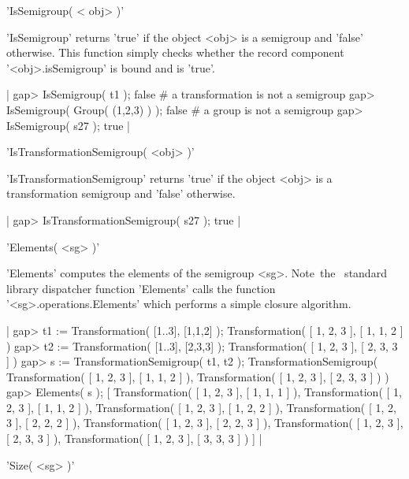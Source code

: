 
'IsSemigroup( < obj> )' 

'IsSemigroup' returns 'true' if the object <obj> is a semigroup
and 'false' otherwise. This function simply checks whether the record 
component '<obj>.isSemigroup' is bound and is 'true'.

|  gap> IsSemigroup( t1 );      
  false                         # a transformation is not a semigroup  
  gap> IsSemigroup( Group( (1,2,3) ) );
  false                         # a group is not a semigroup
  gap> IsSemigroup( s27 );
  true
|


'IsTransformationSemigroup( <obj> )' 

'IsTransformationSemigroup' returns 'true' if the object <obj> 
is a transformation semigroup and 'false' otherwise. 

|  gap> IsTransformationSemigroup( s27 );
  true
|



'Elements( <sg> )' 

'Elements' computes the elements of the semigroup <sg>. Note\:\ the 
\GAP\ standard library dispatcher function 'Elements' calls the function 
'<sg>.operations.Elements' which performs a simple closure 
algorithm.

|  gap> t1 := Transformation( [1..3], [1,1,2] );
  Transformation( [ 1, 2, 3 ], [ 1, 1, 2 ] )
  gap> t2 := Transformation( [1..3], [2,3,3] );
  Transformation( [ 1, 2, 3 ], [ 2, 3, 3 ] )
  gap> s := TransformationSemigroup( t1, t2 );
  TransformationSemigroup( Transformation( [ 1, 2, 3 ], 
  [ 1, 1, 2 ] ), Transformation( [ 1, 2, 3 ], [ 2, 3, 3 ] ) ) 
  gap> Elements( s );
  [ Transformation( [ 1, 2, 3 ], [ 1, 1, 1 ] ), 
    Transformation( [ 1, 2, 3 ], [ 1, 1, 2 ] ), 
    Transformation( [ 1, 2, 3 ], [ 1, 2, 2 ] ), 
    Transformation( [ 1, 2, 3 ], [ 2, 2, 2 ] ), 
    Transformation( [ 1, 2, 3 ], [ 2, 2, 3 ] ), 
    Transformation( [ 1, 2, 3 ], [ 2, 3, 3 ] ), 
    Transformation( [ 1, 2, 3 ], [ 3, 3, 3 ] ) ]
|



'Size( <sg> )' 

